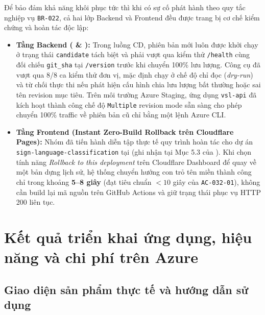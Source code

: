 Để bảo đảm khả năng khôi phục tức thì khi có sự cố phát hành theo quy tắc nghiệp vụ \texttt{BR-022}, cả hai lớp Backend và Frontend đều được trang bị cơ chế kiểm chứng và hoàn tác độc lập:
\begin{itemize}
    \item \textbf{Tầng Backend ( \& ):} Trong luồng CD, phiên bản mới luôn được khởi chạy ở trạng thái \texttt{candidate} tách biệt và phải vượt qua kiểm thử \texttt{/health} cùng đối chiếu \texttt{git\_sha} tại \texttt{/version} trước khi chuyển 100\% lưu lượng. Công cụ  đã vượt qua 8/8 ca kiểm thử đơn vị, mặc định chạy ở chế độ chỉ đọc (\textit{dry-run}) và từ chối thực thi nếu phát hiện cấu hình chia lưu lượng bất thường hoặc sai tên revision mục tiêu. Trên môi trường Azure Staging, ứng dụng \texttt{vsl-api} đã kích hoạt thành công chế độ \texttt{Multiple} revision mode sẵn sàng cho phép chuyển 100\% traffic về phiên bản cũ chỉ bằng một lệnh Azure CLI.
    \item \textbf{Tầng Frontend (Instant Zero-Build Rollback trên Cloudflare Pages):} Nhóm đã tiến hành diễn tập thực tế quy trình hoàn tác cho dự án \texttt{sign-language-classification} tại  (ghi nhận tại Mục 5.3 của ). Khi chọn tính năng \textit{Rollback to this deployment} trên Cloudflare Dashboard để quay về một bản dựng lịch sử, hệ thống chuyển hướng con trỏ tên miền thành công chỉ trong khoảng \textbf{5--8 giây} (đạt tiêu chuẩn $< 10$ giây của \texttt{AC-032-01}), không cần build lại mã nguồn trên GitHub Actions và giữ trạng thái phục vụ HTTP 200 liên tục.
\end{itemize}

\section{Kết quả triển khai ứng dụng, hiệu năng và chi phí trên Azure}
\label{sec:hieu_nang_cloud}

\subsection{Giao diện sản phẩm thực tế và hướng dẫn sử dụng}
\label{subsec:thu_nghiem_nguoi_dung}

